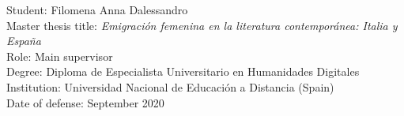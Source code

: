 \documentclass[11pt, a4paper]{article}
\newcommand{\ind}[1]{\textcolor{black!62!white}{\selectfont#1}}
\begin{document}

\ind{Student:} Filomena Anna Dalessandro\\
\ind{Master thesis title:} \textit{Emigración femenina en la literatura contemporánea: Italia y España}\\
\ind{Role:} Main supervisor\\
\ind{Degree:} Diploma de Especialista Universitario en Humanidades Digitales\\
\ind{Institution:} Universidad Nacional de Educación a Distancia (Spain)\\
\ind{Date of defense:} September 2020
\end{document}
